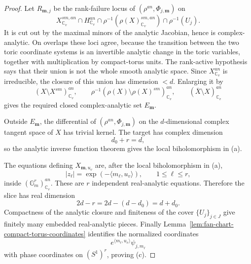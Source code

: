 \documentclass[10pt,a4paper]{amsart}
\theoremstyle{plain}
\theoremstyle{plain}
\numberwithin{equation}{section}
\begin{document}
\begin{proof}
	Let \(R_{\mathbf m,j}\) be the rank-failure locus of
	\((\rho^{an},\Phi_{j,\mathbf m})\) on
	\[
	X^{sm,an}_{\mathbb C_v}\cap H^{an}_{\mathbb C_v}
	\cap\rho^{-1}(\rho(X)^{sm,an}_{\mathbb C_v})\cap\rho^{-1}(U_j).
	\]
	It is cut out by the maximal minors of the analytic Jacobian, hence is
	complex-analytic.  On overlaps these loci agree, because the transition
	between the two toric coordinate systems is an invertible analytic change in
	the toric variables, together with multiplication by compact-torus units.
	The rank-active hypothesis says that their union is not the whole smooth
	analytic space.  Since \(X^{an}_{\mathbb C_v}\) is irreducible, the closure of
	this union has dimension \(<d\).  Enlarging it by
	\[
	(X\setminus X^{sm})^{an}_{\mathbb C_v},\qquad
	\rho^{-1}(\rho(X)\setminus\rho(X)^{sm})^{an}_{\mathbb C_v},\qquad
	(\overline X\setminus X)^{an}_{\mathbb C_v}
	\]
	gives the required closed complex-analytic set \(E_{\mathbf m}\).
	
	Outside \(E_{\mathbf m}\), the differential of
	\((\rho^{an},\Phi_{j,\mathbf m})\) on the \(d\)-dimensional complex tangent
	space of \(X\) has trivial kernel.  The target has complex dimension
	\[
	d_0+r=d,
	\]
	so the analytic inverse function theorem gives the local biholomorphism in
	(a).
	
	The equations defining \(X_{\mathbf m,u_v}\) are, after the local
	biholomorphism in (a),
	\[
	|z_\ell|=\exp(-\langle m_\ell,u_v\rangle),
	\qquad 1\le\ell\le r,
	\]
	inside \((\mathbb G_m^r)^{an}_{\mathbb C_v}\).  These are \(r\) independent
	real-analytic equations.  Therefore the slice has real dimension
	\[
	2d-r=2d-(d-d_0)=d+d_0.
	\]
	Compactness of the analytic closure and finiteness of the cover
	\(\{U_j\}_{j\in J}\) give finitely many embedded real-analytic pieces.  Finally
	Lemma~\ref{lem:fan-chart-compact-torus-coordinates} identifies the normalized
	coordinates
	\[
	e^{\langle m_\ell,u_v\rangle}\psi_{j,m_\ell}
	\]
	with phase coordinates on \((S^1)^r\), proving (c).
\end{proof}
\end{document}

